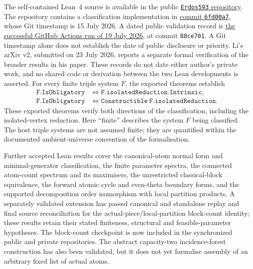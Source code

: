 \documentclass[a4paper,11pt,reqno]{amsart}
\theoremstyle{plain}
\theoremstyle{definition}
\theoremstyle{remark}
\begin{document}
The self-contained Lean~4 source is available in the public
\href{https://github.com/SamPetkov/Erdos593/blob/main/formalization/Erdos593SelfContained.lean}{\texttt{Erdos593} repository}.
The repository contains a classification implementation in
\href{https://github.com/SamPetkov/Erdos593/commit/6fd00a76064401f3f10aabef474f59d3c6ecd6bf}{commit \texttt{6fd00a7}},
whose Git timestamp is 15 July 2026.  A dated public validation record is
\href{https://github.com/SamPetkov/Erdos593/actions/runs/29682191161}{the successful GitHub Actions run of 19 July 2026},
at commit \texttt{88ce701}.  A Git timestamp alone does not establish the date
of public disclosure or priority.  Li's arXiv v2, submitted on 23 July 2026,
reports a separate formal verification of the broader results in his paper.
These records do not date either author's private work, and no shared code
or derivation between the two Lean developments is asserted.
For every finite triple system $F$, the exported theorems establish
\[
\begin{aligned}
\mathtt{F.IsObligatory}
&\Longleftrightarrow \mathtt{F.isolatedReduction.Intrinsic},\\
\mathtt{F.IsObligatory}
&\Longleftrightarrow \mathtt{Constructible\ F.isolatedReduction}.
\end{aligned}
\]
These exported theorems verify both directions of the classification,
including the isolated-vertex reduction.  Here ``finite'' describes the
system $F$ being classified.  The host triple systems are not assumed finite;
they are quantified within the documented ambient-universe convention of the
formalisation.

Further accepted Lean results cover the canonical-atom normal form and
minimal-generator classification, the finite parameter spectra, the connected atom-count
spectrum and its maximisers, the unrestricted classical-block equivalence,
the forward atomic cycle and even-theta boundary forms, and the supported
decomposition order isomorphism with local partition products.  A separately
validated extension has passed canonical and standalone replay and final
source reconciliation for the actual-piece/local-partition block-count
identity; these results retain their stated finiteness, structural and
feasible-parameter hypotheses.  The block-count checkpoint is now included
in the synchronized public and private repositories.  The abstract
capacity-two incidence-forest construction
has also been validated, but it does not yet formalise assembly of an arbitrary
fixed list of actual atoms.
\end{document}
